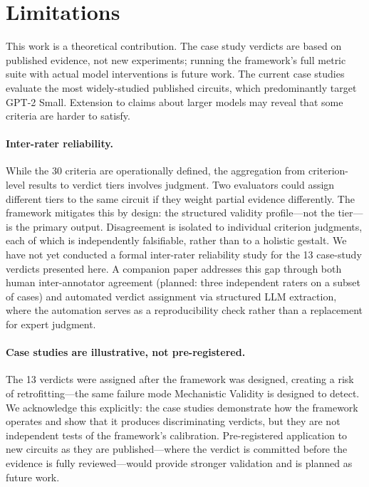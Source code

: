 \documentclass{article}
\begin{document}
\section{Limitations}
\label{sec:limitations}

This work is a theoretical contribution. The case study verdicts are based on published evidence, not new experiments; running the framework's full metric suite with actual model interventions is future work. The current case studies evaluate the most widely-studied published circuits, which predominantly target GPT-2 Small. Extension to claims about larger models may reveal that some criteria are harder to satisfy.

\paragraph{Inter-rater reliability.} While the 30 criteria are operationally defined, the aggregation from criterion-level results to verdict tiers involves judgment. Two evaluators could assign different tiers to the same circuit if they weight partial evidence differently. The framework mitigates this by design: the structured validity profile---not the tier---is the primary output. Disagreement is isolated to individual criterion judgments, each of which is independently falsifiable, rather than to a holistic gestalt. We have not yet conducted a formal inter-rater reliability study for the 13 case-study verdicts presented here. A companion paper addresses this gap through both human inter-annotator agreement (planned: three independent raters on a subset of cases) and automated verdict assignment via structured LLM extraction, where the automation serves as a reproducibility check rather than a replacement for expert judgment.

\paragraph{Case studies are illustrative, not pre-registered.} The 13 verdicts were assigned after the framework was designed, creating a risk of retrofitting---the same failure mode Mechanistic Validity is designed to detect. We acknowledge this explicitly: the case studies demonstrate how the framework operates and show that it produces discriminating verdicts, but they are not independent tests of the framework's calibration. Pre-registered application to new circuits as they are published---where the verdict is committed before the evidence is fully reviewed---would provide stronger validation and is planned as future work.
\end{document}
